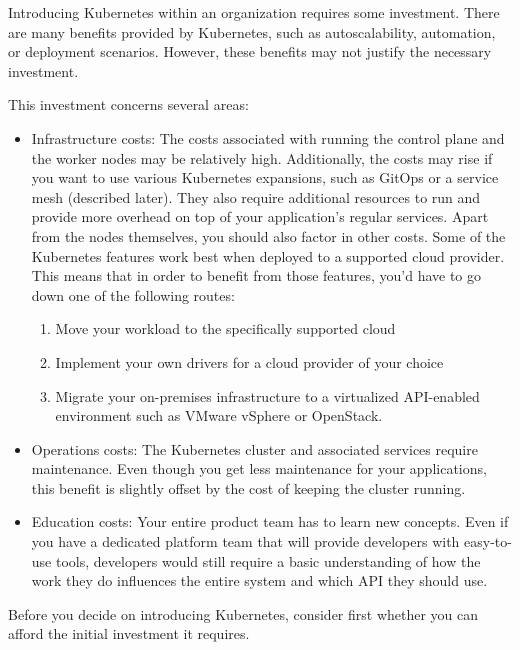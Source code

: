 
Introducing Kubernetes within an organization requires some investment. There are many benefits provided by Kubernetes, such as autoscalability, automation, or deployment scenarios. However, these benefits may not justify the necessary investment.

This investment concerns several areas:

\begin{itemize}
\item 
Infrastructure costs: The costs associated with running the control plane and the worker nodes may be relatively high. Additionally, the costs may rise if you want to use various Kubernetes expansions, such as GitOps or a service mesh (described later). They also require additional resources to run and provide more overhead on top of your application's regular services. Apart from the nodes themselves, you should also factor in other costs. Some of the Kubernetes features work best when deployed to a supported cloud provider. This means that in order to benefit from those features, you'd have to go down one of the following routes:

\begin{enumerate}[label=\alph*]
\item 
Move your workload to the specifically supported cloud

\item
Implement your own drivers for a cloud provider of your choice

\item
Migrate your on-premises infrastructure to a virtualized API-enabled environment such as VMware vSphere or OpenStack.
\end{enumerate}

\item 
Operations costs: The Kubernetes cluster and associated services require maintenance. Even though you get less maintenance for your applications, this benefit is slightly offset by the cost of keeping the cluster running.

\item 
Education costs: Your entire product team has to learn new concepts. Even if you have a dedicated platform team that will provide developers with easy-to-use tools, developers would still require a basic understanding of how the work they do influences the entire system and which API they should use.
\end{itemize}

Before you decide on introducing Kubernetes, consider first whether you can afford the initial investment it requires.












